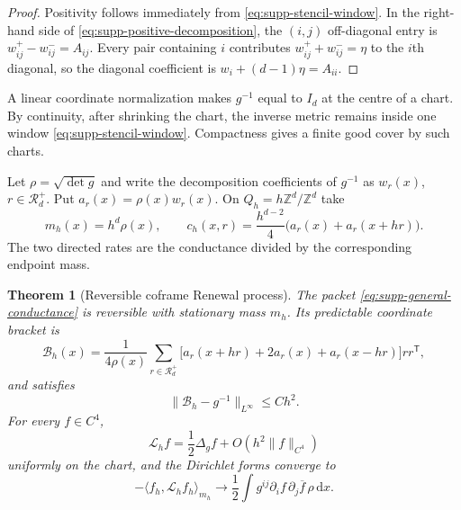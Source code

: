 \documentclass[11pt]{article}
\newtheorem{theorem}{Theorem}[section]
\theoremstyle{definition}
\theoremstyle{remark}
\theoremstyle{definition}
\theoremstyle{remark}
\newcommand{\dd}{\mathrm d}
\begin{document}
\begin{proof}
Positivity follows immediately from \eqref{eq:supp-stencil-window}.  In the
right-hand side of \eqref{eq:supp-positive-decomposition}, the $(i,j)$ off-diagonal
entry is $w_{ij}^+-w_{ij}^-=A_{ij}$.  Every pair containing $i$ contributes
$w_{ij}^++w_{ij}^-=\eta$ to the $i$th diagonal, so the diagonal coefficient is
$w_i+(d-1)\eta=A_{ii}$.
\end{proof}

A linear coordinate normalization makes $g^{-1}$ equal to $I_d$ at the centre of a
chart.  By continuity, after shrinking the chart, the inverse metric remains inside
one window \eqref{eq:supp-stencil-window}.  Compactness gives a finite good cover by
such charts.

Let $\rho=\sqrt{\det g}$ and write the decomposition coefficients of $g^{-1}$ as
$w_r(x)$, $r\in\mathcal R_d^+$.  Put $a_r(x)=\rho(x)w_r(x)$.  On
$Q_h=h\mathbb Z^d/\mathbb Z^d$ take
\begin{equation}
m_h(x)=h^d\rho(x),
\qquad
c_h(x,r)=\frac{h^{d-2}}4\bigl(a_r(x)+a_r(x+hr)\bigr).
\label{eq:supp-general-conductance}
\end{equation}
The two directed rates are the conductance divided by the corresponding endpoint
mass.

\begin{theorem}[Reversible coframe Renewal process]
\label{thm:supp-general-renewal-process}
The packet \eqref{eq:supp-general-conductance} is reversible with stationary mass
$m_h$.  Its predictable coordinate bracket is
\begin{equation}
{
\mathcal B_h(x)
=\frac1{4\rho(x)}
\sum_{r\in\mathcal R_d^+}
\bigl[a_r(x+hr)+2a_r(x)+a_r(x-hr)\bigr]rr^{\mathsf T},}
\label{eq:supp-general-bracket}
\end{equation}
and satisfies
\begin{equation}
\|\mathcal B_h-g^{-1}\|_{L^\infty}\le Ch^2.
\label{eq:supp-general-bracket-error}
\end{equation}
For every $f\in C^4$,
\begin{equation}
{\mathcal L_hf=\frac12\Delta_gf+O(h^2\|f\|_{C^4})}
\label{eq:supp-general-generator}
\end{equation}
uniformly on the chart, and the Dirichlet forms converge to
\begin{equation}
-\langle f_h,\mathcal L_hf_h\rangle_{m_h}
\longrightarrow
\frac12\int g^{ij}\partial_if\,\partial_j\overline f\,\rho\,\dd x.
\label{eq:supp-general-form-limit}
\end{equation}
\end{theorem}
\end{document}
